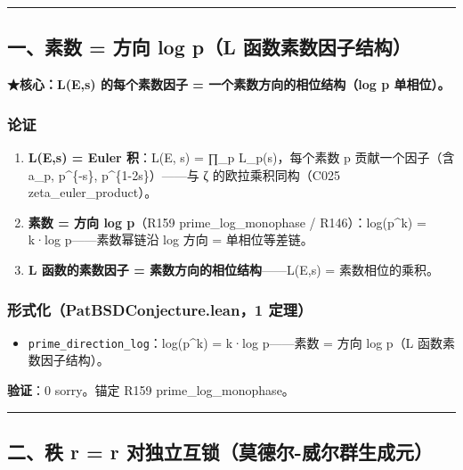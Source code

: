 \documentclass[
]{article}
\providecommand{\tightlist}{%
 \setlength{\itemsep}{0pt}\setlength{\parskip}{0pt}}
\begin{document}
\begin{center}\rule{0.5\linewidth}{0.5pt}\end{center}

\subsection{一、素数 = 方向 log p（L
函数素数因子结构）}\label{ux4e00ux7d20ux6570-ux65b9ux5411-log-pl-ux51fdux6570ux7d20ux6570ux56e0ux5b50ux7ed3ux6784}

\textbf{★核心：L(E,s) 的每个素数因子 = 一个素数方向的相位结构（log p
单相位）。}

\subsubsection{论证}\label{ux8bbaux8bc1}

\begin{enumerate}
\def\labelenumi{\arabic{enumi}.}
\tightlist
\item
 \textbf{L(E,s) = Euler 积}：L(E, s) = ∏\_p L\_p(s)，每个素数 p
 贡献一个因子（含 a\_p, p\^{}\{-s\}, p\^{}\{1-2s\}）------与 ζ
 的欧拉乘积同构（C025 zeta\_euler\_product）。
\item
 \textbf{素数 = 方向 log p}（R159 prime\_log\_monophase /
 R146）：log(p\^{}k) = k·log p------素数幂链沿 log 方向 =
 单相位等差链。
\item
 \textbf{L 函数的素数因子 = 素数方向的相位结构}------L(E,s) =
 素数相位的乘积。
\end{enumerate}

\subsubsection{形式化（PatBSDConjecture.lean，1
定理）}\label{ux5f62ux5f0fux5316patbsdconjecture.lean1-ux5b9aux7406}

\begin{itemize}
\tightlist
\item
 \texttt{prime\_direction\_log}：log(p\^{}k) = k·log p------素数 = 方向
 log p（L 函数素数因子结构）。
\end{itemize}

\textbf{验证}：0 sorry。锚定 R159 prime\_log\_monophase。

\begin{center}\rule{0.5\linewidth}{0.5pt}\end{center}

\subsection{二、秩 r = r
对独立互锁（莫德尔-威尔群生成元）}\label{ux4e8cux79e9-r-r-ux5bf9ux72ecux7acbux4e92ux9501ux83abux5fb7ux5c14-ux5a01ux5c14ux7fa4ux751fux6210ux5143}
\end{document}
